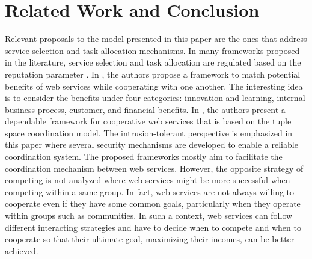 \documentclass[runningheads,a4paper]{llncs}
\begin{document}
\section{Related Work and Conclusion}\label{Conclusion}

Relevant proposals to the model presented in this paper are the
ones that address service selection and task allocation
mechanisms. In many frameworks proposed in the literature, service
selection and task allocation are regulated based on the
reputation parameter \cite{Maximilien2,Kalepu,Rosario,Ruth}. In
\cite{Huang}, the authors propose a framework to match potential
benefits of web services while cooperating with one another. The
interesting idea is to consider the benefits under four
categories: innovation and learning, internal business process,
customer, and financial benefits. In \cite{Alchieri}, the authors
present a dependable framework for cooperative web services that
is based on the tuple space coordination model. The
intrusion-tolerant perspective is emphasized in this paper where
several security mechanisms are developed to enable a reliable
coordination system. %
The proposed frameworks mostly aim to facilitate the coordination
mechanism between web services. However, the opposite strategy of
competing is not analyzed where web services might be more
successful when competing within a same group. In fact, web
services are not always willing to cooperate even if they have
some common goals, particularly when they operate within groups
such as communities. In such a context, web services can follow
different interacting strategies and have to decide when to
compete and when to cooperate so that their ultimate goal,
maximizing their incomes, can be better achieved.
\end{document}
